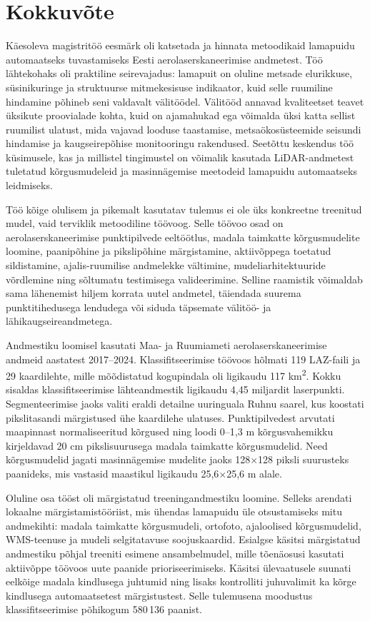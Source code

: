 \section{Kokkuvõte}
\label{kokkuvõte}

Käesoleva magistritöö eesmärk oli katsetada ja hinnata metoodikaid lamapuidu automaatseks tuvastamiseks Eesti aerolaserskaneerimise andmetest. Töö lähtekohaks oli praktiline seirevajadus: lamapuit on oluline metsade elurikkuse, süsinikuringe ja struktuurse mitmekesisuse indikaator, kuid selle ruumiline hindamine põhineb seni valdavalt välitöödel. Välitööd annavad kvaliteetset teavet üksikute proovialade kohta, kuid on ajamahukad ega võimalda üksi katta sellist ruumilist ulatust, mida vajavad looduse taastamise, metsaökosüsteemide seisundi hindamise ja kaugseirepõhise monitooringu rakendused. Seetõttu keskendus töö küsimusele, kas ja millistel tingimustel on võimalik kasutada LiDAR-andmetest tuletatud kõrgusmudeleid ja masinnägemise meetodeid lamapuidu automaatseks leidmiseks.

Töö kõige olulisem ja pikemalt kasutatav tulemus ei ole üks konkreetne treenitud mudel, vaid terviklik metoodiline töövoog. Selle töövoo osad on aerolaserskaneerimise punktipilvede eeltöötlus, madala taimkatte kõrgusmudelite loomine, paanipõhine ja pikslipõhine märgistamine, aktiivõppega toetatud sildistamine, ajalis-ruumilise andmelekke vältimine, mudeliarhitektuuride võrdlemine ning sõltumatu testimisega valideerimine. Selline raamistik võimaldab sama lähenemist hiljem korrata uutel andmetel, täiendada suurema punktitihedusega lendudega või siduda täpsemate välitöö- ja lähikaugseireandmetega.

Andmestiku loomisel kasutati Maa- ja Ruumiameti aerolaserskaneerimise andmeid aastatest 2017--2024. Klassifitseerimise töövoos hõlmati 119 LAZ-faili ja 29 kaardilehte, mille mõõdistatud kogupindala oli ligikaudu 117 km\textsuperscript{2}. Kokku sisaldas klassifitseerimise lähteandmestik ligikaudu 4,45 miljardit laserpunkti. Segmenteerimise jaoks valiti eraldi detailne uuringuala Ruhnu saarel, kus koostati pikslitasandi märgistused ühe kaardilehe ulatuses. Punktipilvedest arvutati maapinnast normaliseeritud kõrgused ning loodi 0--1,3 m kõrgusvahemikku kirjeldavad 20 cm pikslisuurusega madala taimkatte kõrgusmudelid. Need kõrgusmudelid jagati masinnägemise mudelite jaoks 128$\times$128 piksli suurusteks paanideks, mis vastasid maastikul ligikaudu 25,6$\times$25,6 m alale.

Oluline osa tööst oli märgistatud treeningandmestiku loomine. Selleks arendati lokaalne märgistamistööriist, mis ühendas lamapuidu üle otsustamiseks mitu andmekihti: madala taimkatte kõrgusmudeli, ortofoto, ajaloolised kõrgusmudelid, WMS-teenuse ja mudeli selgitatavuse soojuskaardid. Esialgse käsitsi märgistatud andmestiku põhjal treeniti esimene ansambelmudel, mille tõenäosusi kasutati aktiivõppe töövoos uute paanide prioriseerimiseks. Käsitsi ülevaatusele suunati eelkõige madala kindlusega juhtumid ning lisaks kontrolliti juhuvalimit ka kõrge kindlusega automaatsetest märgistustest. Selle tulemusena moodustus klassifitseerimise põhikogum 580\,136 paanist.

